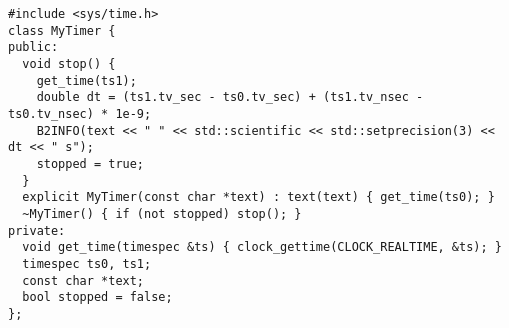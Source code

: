 \begin{verbatim}
#include <sys/time.h>
class MyTimer {
public:
  void stop() {
    get_time(ts1);
    double dt = (ts1.tv_sec - ts0.tv_sec) + (ts1.tv_nsec - ts0.tv_nsec) * 1e-9;
    B2INFO(text << " " << std::scientific << std::setprecision(3) << dt << " s");
    stopped = true;
  }
  explicit MyTimer(const char *text) : text(text) { get_time(ts0); }
  ~MyTimer() { if (not stopped) stop(); }
private:
  void get_time(timespec &ts) { clock_gettime(CLOCK_REALTIME, &ts); }
  timespec ts0, ts1;
  const char *text;
  bool stopped = false;
};
\end{verbatim}
